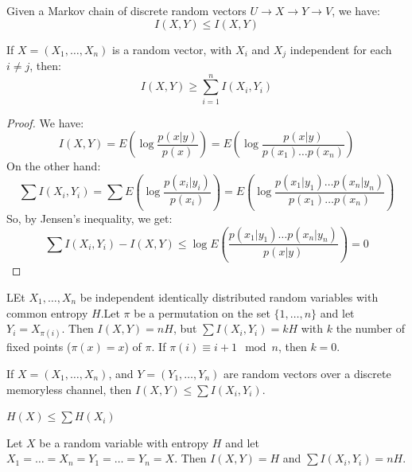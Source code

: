 \begin{theorem}\label{2.2.1}
    Given a Markov chain of discrete random vectors $U \rightarrow X \rightarrow
    Y \rightarrow V$, we have:
    \begin{equation}
        I(X,Y) \leq I(X,Y)
    \end{equation}
\end{theorem}

\begin{theorem}\label{2.2.2}
    If $X=(X_1, \dots, X_n)$ is a random vector, with $X_i$ and  $X_j$
    independent for each $i \neq j$, then:
    \begin{equation}
        I(X,Y) \geq \sum_{i=1}^n{I(X_i,Y_i)}
    \end{equation}
\end{theorem}
\begin{proof}
    We have:
    \begin{equation*}
        I(X,Y)=E(\log{\frac{p(x|y)}{p(x)}})=E(\log{\frac{p(x|y)}{p(x_1) \dots
        p(x_n)}})
    \end{equation*}
    On the other hand:
    \begin{equation*}
        \sum{I(X_i,Y_i)}=\sum{E(\log{\frac{p(x_i|y_i)}{p(x_i)}})}=
        E(\log{\frac{p(x_1|y_1) \dots p(x_n|y_n)}{p(x_1) \dots p(x_n)}})
    \end{equation*}
    So, by Jensen's inequality, we get:
    \begin{equation*}
        \sum{I(X_i,Y_i)}-I(X,Y) \leq \log{E(\frac{p(x_1|y_1) \dots
        p(x_n|y_n)}{p(x|y)})}=0
    \end{equation*}
\end{proof}

\begin{example}
    LEt $X_1, \dots, X_n$ be independent identically distributed random
    variables with common entropy $H$.Let $\pi$ be a permutation on the set
    $\{1, \dots, n\}$ and let $Y_i=X_{\pi(i)}$. Then $I(X,Y)=nH$, but
    $\sum{I(X_i,Y_i)}=kH$ with $k$ the number of fixed points ($\pi(x)=x$) of
    $\pi$. If  $\pi(i) \equiv i+1 \mod{n}$, then $k=0$.
\end{example}

\begin{theorem}\label{2.2.3}
    If $X=(X_1, \dots, X_n)$, and $Y=(Y_1, \dots, Y_n)$ are random vectors over
    a discrete memoryless channel, then $I(X,Y) \leq \sum{I(X_i,Y_i)}$.
\end{theorem}
\begin{corollary}
    $H(X) \leq \sum{H(X_i)}$
\end{corollary}

\begin{example}
    Let $X$ be a random variable with entropy  $H$ and let
    $X_1=\dots=X_n=Y_1=\dots=Y_n=X$. Then $I(X,Y)=H$ and $\sum{I(X_i,Y_i)}=nH$.
\end{example}
